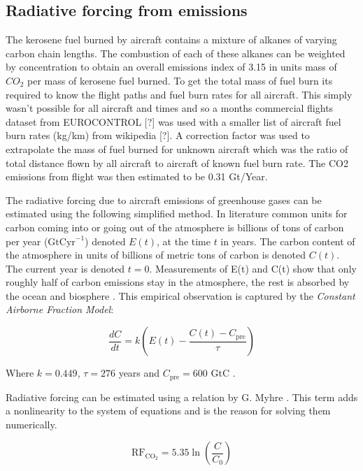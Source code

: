 \documentclass{article}
\begin{document}
\subsection{Radiative forcing from emissions}

The kerosene fuel burned by aircraft contains a mixture of alkanes of varying carbon chain lengths.
The combustion of each of these alkanes can be weighted by concentration to obtain an overall
emissions index of 3.15 in units mass of $CO_2$ per mass of kerosene fuel burned.
To get the total mass of fuel burn its required to know the flight paths and fuel burn rates for all aircraft.
This simply wasn't possible for all aircraft and times and so a months commercial flights dataset from EUROCONTROL [?] was used with a smaller list of aircraft fuel burn rates (kg/km) from wikipedia [?].
A correction factor was used to extrapolate the mass of fuel burned for unknown aircraft which was the ratio of total distance flown by all aircraft to aircraft of known fuel burn rate.
The CO2 emissions from flight was then estimated to be 0.31 Gt/Year.

The radiative forcing due to aircraft emissions of greenhouse gases can be estimated using the following simplified method.
In literature common units for carbon coming into or going out of the atmosphere is billions of tons of carbon per year ($\text{GtCyr}^{-1}$)
denoted $E(t)$, at the time $t$ in years. The carbon content of the atmosphere in units of billions of metric tons of carbon is denoted $C(t)$.
The current year is denoted $t=0$.
Measurements of E(t) and C(t) show that only roughly half of carbon emissions stay in the atmosphere, the rest is absorbed by the ocean and biosphere \cite{co2_modelling}.
This empirical observation is captured by the \emph{Constant Airborne Fraction Model}:

\begin{equation}
    \frac{dC}{dt} = k \left( E(t) - \frac{C(t)-C_\text{pre}}{\tau}\right)
\end{equation}

Where $k = 0.449$, $\tau = 276 $ years and $C_\text{pre} = 600$ GtC \cite{co2_modelling}.

Radiative forcing can be estimated using a relation by G. Myhre \cite{rf_greenhouse}.
This term adds a nonlinearity to the system of equations and is the reason for solving them numerically.

\begin{equation}
    \text{RF}_{\text{CO}_2} = 5.35 \ln \left( \frac{C}{C_0} \right)
\end{equation}
\end{document}
